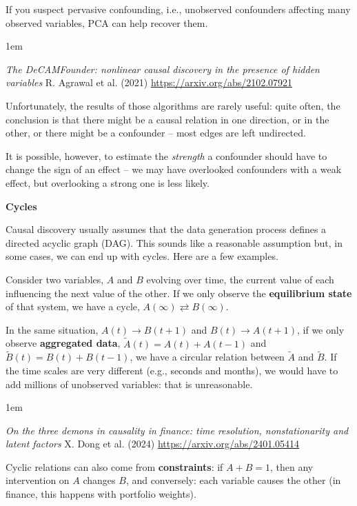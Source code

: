 \documentclass[a5paper]{article}
\let\d\textbf
\newenvironment{reference}{%
  \medskip\goodbreak
  \parskip 0pt
  \raggedright
  \leftskip 1em
  \obeylines
}{\par\medskip\goodbreak}
\def\subsection#1{{\par\bigskip\goodbreak\large\bfseries #1\par}}
\begin{document}
If you suspect pervasive confounding,
i.e., unobserved confounders affecting many observed variables,
PCA can help recover them.

\begin{reference}
  \emph{The DeCAMFounder: nonlinear causal discovery in the presence of hidden variables}
  R. Agrawal et al. (2021)
  \url{https://arxiv.org/abs/2102.07921}
\end{reference}

Unfortunately, the results of those algorithms are rarely useful:
quite often, the conclusion is that 
there might be a causal relation in one direction, or in the other,
or there might be a confounder -- most edges are left undirected.

It is possible, however, to estimate the \emph{strength} a confounder should have
to change the sign of an effect -- we may have overlooked confounders with a weak effect,
but overlooking a strong one is less likely.

\subsection{Cycles}

Causal discovery usually assumes that the data generation process defines a directed acyclic graph (DAG).
This sounds like a reasonable assumption but, in some cases, we can end up with cycles.
Here are a few examples.

Consider two variables, $A$ and $B$ evolving over time,
the current value of each influencing the next value of the other.
If we only observe the \d{equilibrium state} of that system, we
have a cycle,
$A(\infty) \rightleftarrows B(\infty)$.

In the same situation,
$A(t)\to B(t+1)$ and $B(t) \to A(t+1)$,
if we only observe \d{aggregated data},
$\tilde A(t)=A(t)+A(t-1)$ and $\tilde B(t)=B(t)+B(t-1)$,
we have a circular relation between $\tilde A$ and $\tilde B$.
If the time scales are very different (e.g., seconds and months),
we would have to add millions of unobserved variables: that is unreasonable.

\begin{reference}
  \emph{On the three demons in causality in finance: time resolution, nonstationarity and latent factors}
  X. Dong et al. (2024)
  \url{https://arxiv.org/abs/2401.05414}
\end{reference}

Cyclic relations can also come from \d{constraints}:
if $A+B=1$, then any intervention on $A$ changes $B$, and conversely:
each variable causes the other
(in finance, this happens with portfolio weights).
\end{document}
